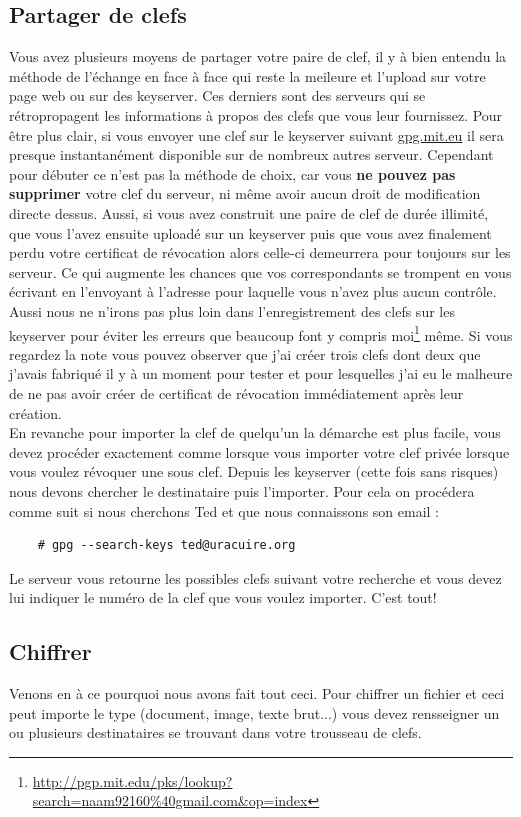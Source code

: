 \documentclass[a4paper]{article}
\begin{document}
\subsection{Partager de clefs}
Vous avez plusieurs moyens de partager votre paire de clef, il y à bien
entendu la méthode de l'échange en face à face qui reste la meileure et l'upload
sur votre page web ou sur des keyserver. Ces derniers sont des serveurs qui
se rétropropagent les informations à propos des clefs que vous leur fournissez.
Pour être plus clair, si vous envoyer une clef sur le keyserver suivant
\url{gpg.mit.eu} il sera presque instantanément disponible sur de nombreux autres
serveur. Cependant pour débuter ce n'est pas la méthode de choix, car vous
\textbf{ne pouvez pas supprimer} votre clef du serveur, ni même avoir aucun droit de
modification directe dessus. Aussi, si vous avez construit une paire de clef
de durée illimité,
que vous l'avez ensuite uploadé sur un keyserver puis que vous avez finalement
perdu votre certificat de révocation alors celle-ci demeurrera pour toujours
sur les serveur. Ce qui augmente les chances que vos correspondants se trompent
en vous écrivant en l'envoyant à l'adresse pour laquelle vous n'avez plus aucun
contrôle.
Aussi nous ne n'irons pas plus loin dans l'enregistrement des clefs sur les
keyserver pour éviter les erreurs que beaucoup font y compris moi\footnote{\url{http://pgp.mit.edu/pks/lookup?search=naam92160\%40gmail.com\&op=index}}
même. Si vous regardez la note vous pouvez observer que j'ai créer trois clefs
dont deux que j'avais fabriqué il y à un moment pour tester et pour lesquelles
j'ai eu le malheure de ne pas avoir créer de certificat de révocation
immédiatement après leur création.
\\
En revanche pour importer la clef de quelqu'un la démarche est plus facile,
vous devez procéder exactement comme lorsque vous importer votre clef privée
lorsque vous voulez révoquer une sous clef. Depuis les keyserver (cette fois
sans risques) nous devons chercher le destinataire puis l'importer. Pour cela
on procédera comme suit si nous cherchons Ted et que nous connaissons son email :
\begin{verbatim}
    # gpg --search-keys ted@uracuire.org
\end{verbatim}
Le serveur vous retourne les possibles clefs suivant votre recherche et vous
devez lui indiquer le numéro de la clef que vous voulez importer. C'est tout!

\subsection{Chiffrer}
Venons en à ce pourquoi nous avons fait tout ceci. Pour chiffrer un fichier et
ceci peut importe le type (document, image, texte brut...) vous devez
rensseigner un ou plusieurs destinataires se trouvant dans votre trousseau de
clefs.
\end{document}
